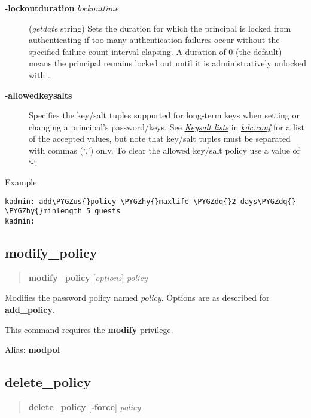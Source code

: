 \documentclass[letterpaper,10pt,english]{sphinxmanual}
\def\PYGZus{\char`\_}
\def\PYGZhy{\char`\-}
\def\PYGZdq{\char`\"}
\begin{document}
\label{admin/database:policy-lockoutduration}\begin{description}
\item[{\textbf{-lockoutduration} \emph{lockouttime}}] \leavevmode
(\emph{getdate} string) Sets the duration for which the principal
is locked from authenticating if too many authentication failures
occur without the specified failure count interval elapsing.
A duration of 0 (the default) means the principal remains locked
out until it is administratively unlocked with .

\item[{\textbf{-allowedkeysalts}}] \leavevmode
Specifies the key/salt tuples supported for long-term keys when
setting or changing a principal's password/keys.  See
{\hyperref[admin/conf_files/kdc_conf:keysalt-lists]{\emph{Keysalt lists}}} in {\hyperref[admin/conf_files/kdc_conf:kdc-conf-5]{\emph{kdc.conf}}} for a list of the
accepted values, but note that key/salt tuples must be separated
with commas (`,') only.  To clear the allowed key/salt policy use
a value of `-`.

\end{description}

Example:

\begin{Verbatim}[commandchars=\\\{\}]
kadmin: add\PYGZus{}policy \PYGZhy{}maxlife \PYGZdq{}2 days\PYGZdq{} \PYGZhy{}minlength 5 guests
kadmin:
\end{Verbatim}


\subsection{modify\_policy}
\label{admin/database:modify-policy}\begin{quote}

\textbf{modify\_policy} {[}\emph{options}{]} \emph{policy}
\end{quote}

Modifies the password policy named \emph{policy}.  Options are as described
for \textbf{add\_policy}.

This command requires the \textbf{modify} privilege.

Alias: \textbf{modpol}


\subsection{delete\_policy}
\label{admin/database:delete-policy}\begin{quote}

\textbf{delete\_policy} {[}\textbf{-force}{]} \emph{policy}
\end{quote}
\end{document}
